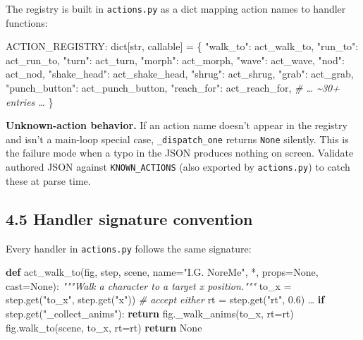 \documentclass[
  12pt,
  letterpaper,
]{book}
\newenvironment{Shaded}{}{}
\newcommand{\BuiltInTok}[1]{\textcolor[rgb]{0.00,0.50,0.00}{#1}}
\newcommand{\CommentTok}[1]{\textcolor[rgb]{0.38,0.63,0.69}{\textit{#1}}}
\newcommand{\ControlFlowTok}[1]{\textcolor[rgb]{0.00,0.44,0.13}{\textbf{#1}}}
\newcommand{\FloatTok}[1]{\textcolor[rgb]{0.25,0.63,0.44}{#1}}
\newcommand{\KeywordTok}[1]{\textcolor[rgb]{0.00,0.44,0.13}{\textbf{#1}}}
\newcommand{\NormalTok}[1]{#1}
\newcommand{\OperatorTok}[1]{\textcolor[rgb]{0.40,0.40,0.40}{#1}}
\newcommand{\StringTok}[1]{\textcolor[rgb]{0.25,0.44,0.63}{#1}}
\newcommand{\VariableTok}[1]{\textcolor[rgb]{0.10,0.09,0.49}{#1}}
\begin{document}
The registry is built in \texttt{actions.py} as a dict mapping action
names to handler functions:

\begin{Shaded}
\begin{Highlighting}[]
\NormalTok{ACTION\_REGISTRY: }\BuiltInTok{dict}\NormalTok{[}\BuiltInTok{str}\NormalTok{, }\BuiltInTok{callable}\NormalTok{] }\OperatorTok{=}\NormalTok{ \{}
    \StringTok{"walk\_to"}\NormalTok{:   act\_walk\_to,}
    \StringTok{"run\_to"}\NormalTok{:    act\_run\_to,}
    \StringTok{"turn"}\NormalTok{:      act\_turn,}
    \StringTok{"morph"}\NormalTok{:     act\_morph,}
    \StringTok{"wave"}\NormalTok{:      act\_wave,}
    \StringTok{"nod"}\NormalTok{:       act\_nod,}
    \StringTok{"shake\_head"}\NormalTok{: act\_shake\_head,}
    \StringTok{"shrug"}\NormalTok{:     act\_shrug,}
    \StringTok{"grab"}\NormalTok{:      act\_grab,}
    \StringTok{"punch\_button"}\NormalTok{: act\_punch\_button,}
    \StringTok{"reach\_for"}\NormalTok{: act\_reach\_for,}
    \CommentTok{\# … \textasciitilde{}30+ entries …}
\NormalTok{\}}
\end{Highlighting}
\end{Shaded}

\textbf{Unknown-action behavior.} If an action name doesn't appear in
the registry and isn't a main-loop special case,
\texttt{\_dispatch\_one} returns \texttt{None} silently. This is the
failure mode when a typo in the JSON produces nothing on screen.
Validate authored JSON against \texttt{KNOWN\_ACTIONS} (also exported by
\texttt{actions.py}) to catch these at parse time.

\subsection{4.5 Handler signature
convention}\label{handler-signature-convention}

Every handler in \texttt{actions.py} follows the same signature:

\begin{Shaded}
\begin{Highlighting}[]
\KeywordTok{def}\NormalTok{ act\_walk\_to(fig, step, scene, name}\OperatorTok{=}\StringTok{"I.G. NoreMe"}\NormalTok{,}
                \OperatorTok{*}\NormalTok{, props}\OperatorTok{=}\VariableTok{None}\NormalTok{, cast}\OperatorTok{=}\VariableTok{None}\NormalTok{):}
    \CommentTok{"""Walk a character to a target x position."""}
\NormalTok{    to\_x }\OperatorTok{=}\NormalTok{ step.get(}\StringTok{"to\_x"}\NormalTok{, step.get(}\StringTok{"x"}\NormalTok{))  }\CommentTok{\# accept either}
\NormalTok{    rt   }\OperatorTok{=}\NormalTok{ step.get(}\StringTok{"rt"}\NormalTok{, }\FloatTok{0.6}\NormalTok{)}
\NormalTok{    …}
    \ControlFlowTok{if}\NormalTok{ step.get(}\StringTok{"\_collect\_anims"}\NormalTok{):}
        \ControlFlowTok{return}\NormalTok{ fig.\_walk\_anims(to\_x, rt}\OperatorTok{=}\NormalTok{rt)}
\NormalTok{    fig.walk\_to(scene, to\_x, rt}\OperatorTok{=}\NormalTok{rt)}
    \ControlFlowTok{return} \VariableTok{None}
\end{Highlighting}
\end{Shaded}
\end{document}
